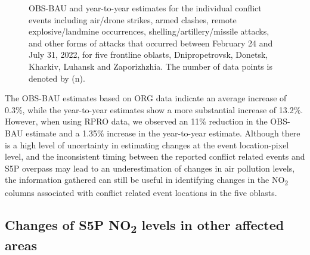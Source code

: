\begin{figure}[tbh!]
\begin{subfigure}{.5\textwidth}
      \caption{}
      \label{fig:fig7b}
    \end{subfigure}
    \caption[NO\textsubscript{2} level changes estimates for conflict events]{OBS-BAU and year-to-year estimates for the individual conflict events including air/drone strikes, armed clashes, remote explosive/landmine occurrences, shelling/artillery/missile attacks, and other forms of attacks that occurred between February 24 and July 31, 2022, for five frontline oblasts, Dnipropetrovsk, Donetsk, Kharkiv, Luhansk and Zaporizhzhia. The number of data points is denoted by (n).}
    \label{fig:chap3_fig7}
\end{figure}
The OBS-BAU estimates based on ORG data indicate an average increase of 0.3\%, while the year-to-year estimates show a more substantial increase of 13.2\%. However, when using RPRO data, we observed an 11\% reduction in the OBS-BAU estimate and a 1.35\% increase in the year-to-year estimate. Although there is a high level of uncertainty in estimating changes at the event location-pixel level, and the inconsistent timing between the reported conflict related events and S5P overpass may lead to an underestimation of changes in air pollution levels, the information gathered can still be useful in identifying changes in the NO\textsubscript{2} columns associated with conflict related event locations in the five oblasts.\par
\subsection{Changes of S5P NO\textsubscript{2} levels in other affected areas}
